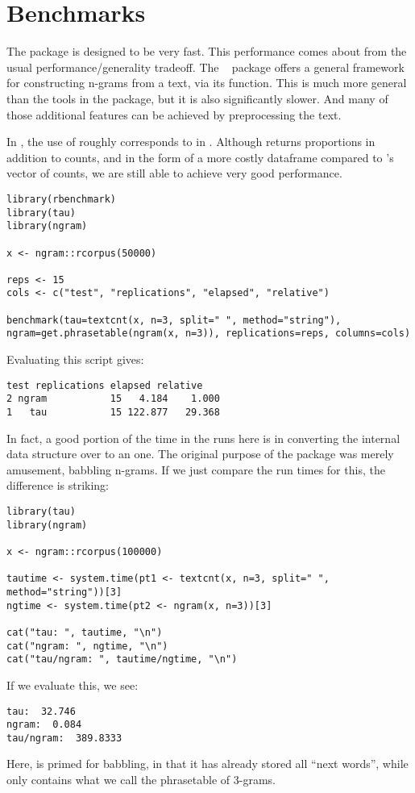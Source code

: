 \section{Benchmarks}\label{sec:benchmarks}

The  package is designed to be very fast.  This performance comes
about from the usual performance/generality tradeoff.  
The ~\citep{tau} package offers a general framework for constructing
n-grams from a text, via its  function.  This is much more
general than the tools in the  package, but it is also
significantly slower.  And many of those additional features can be achieved
by preprocessing the text.

In , the use of  roughly corresponds
to  in .  Although
 returns proportions in addition to counts, and in the
form of a more costly dataframe compared to 's vector of counts, we
are still able to achieve very good performance.
\begin{lstlisting}[language=rr]
library(rbenchmark)
library(tau)
library(ngram)

x <- ngram::rcorpus(50000)

reps <- 15
cols <- c("test", "replications", "elapsed", "relative")

benchmark(tau=textcnt(x, n=3, split=" ", method="string"), ngram=get.phrasetable(ngram(x, n=3)), replications=reps, columns=cols)
\end{lstlisting}
Evaluating this script gives:
\begin{lstlisting}[language=rout]
   test replications elapsed relative
2 ngram           15   4.184    1.000
1   tau           15 122.877   29.368
\end{lstlisting}

In fact, a good portion of the time in the  runs here is in converting the
internal  data structure over to an  one.  The original
purpose of the  package was merely amusement, babbling n-grams.
If we just compare the run times for this, the difference is striking:
\begin{lstlisting}[language=rr]
library(tau)
library(ngram)

x <- ngram::rcorpus(100000)

tautime <- system.time(pt1 <- textcnt(x, n=3, split=" ", method="string"))[3]
ngtime <- system.time(pt2 <- ngram(x, n=3))[3]

cat("tau: ", tautime, "\n")
cat("ngram: ", ngtime, "\n")
cat("tau/ngram: ", tautime/ngtime, "\n")
\end{lstlisting}
If we evaluate this, we see:
\begin{lstlisting}[language=rout]
tau:  32.746 
ngram:  0.084 
tau/ngram:  389.8333 
\end{lstlisting}
Here,  is primed for babbling, in that it has already stored all
``next words'', while  only contains what we call the phrasetable of
3-grams.
